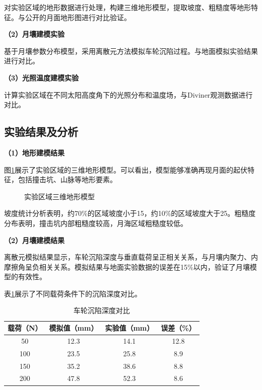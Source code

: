对实验区域的地形数据进行处理，构建三维地形模型，提取坡度、粗糙度等地形特征。与公开的月面地形图进行对比验证。

\textbf{（2）月壤建模实验}

基于月壤参数分布模型，采用离散元方法模拟车轮沉陷过程。与地面模拟实验结果进行对比。

\textbf{（3）光照温度建模实验}

计算实验区域在不同太阳高度角下的光照分布和温度场，与Diviner观测数据进行对比。

\subsection{实验结果及分析}
\label{subsec:exp_results}

\textbf{（1）地形建模结果}

图\ref{fig:terrain_result}展示了实验区域的三维地形模型。可以看出，模型能够准确再现月面的起伏特征，包括撞击坑、山脉等地形要素。

\begin{figure}[htbp]
    \centering
    \caption{实验区域三维地形模型}
    \label{fig:terrain_result}
\end{figure}

坡度统计分析表明，约70\%的区域坡度小于15\degree，约10\%的区域坡度大于25\degree。粗糙度分布表明，撞击坑内部粗糙度较高，月海区域粗糙度较低。

\textbf{（2）月壤建模结果}

离散元模拟结果显示，车轮沉陷深度与垂直载荷呈正相关关系，与月壤内聚力、内摩擦角呈负相关关系。模拟结果与地面实验数据的误差在15\%以内，验证了月壤模型的有效性。

表\ref{tab:sinkage_result}展示了不同载荷条件下的沉陷深度对比。

\begin{table}[htbp]
    \centering
    \caption{车轮沉陷深度对比}
    \label{tab:sinkage_result}
    \begin{tabular}{cccc}
        \toprule
        载荷（N） & 模拟值（mm） & 实验值（mm） & 误差（\%） \\
        \midrule
        50 & 12.3 & 14.1 & 12.8 \\
        100 & 23.5 & 25.8 & 8.9 \\
        150 & 35.2 & 38.6 & 8.8 \\
        200 & 47.8 & 52.3 & 8.6 \\
        \bottomrule
    \end{tabular}
\end{table}


